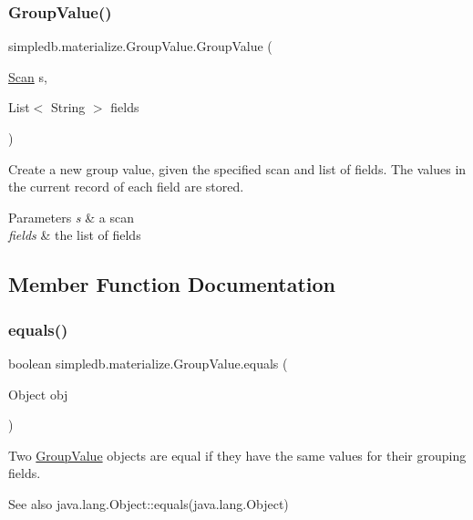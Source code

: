 \subsubsection{\texorpdfstring{Group\+Value()}{GroupValue()}}
{\footnotesize\ttfamily simpledb.\+materialize.\+Group\+Value.\+Group\+Value (\begin{DoxyParamCaption}\item[{\hyperlink{interfacesimpledb_1_1query_1_1Scan}{Scan}}]{s,  }\item[{List$<$ String $>$}]{fields }\end{DoxyParamCaption})\hspace{0.3cm}{\ttfamily [inline]}}

Create a new group value, given the specified scan and list of fields. The values in the current record of each field are stored. 
\begin{DoxyParams}{Parameters}
{\em s} & a scan \\
\hline
{\em fields} & the list of fields \\
\hline
\end{DoxyParams}


\subsection{Member Function Documentation}
\mbox{\label{classsimpledb_1_1materialize_1_1GroupValue_a5b0b30fc31eb67a79015bdc8b08340b0}} 
\subsubsection{\texorpdfstring{equals()}{equals()}}
{\footnotesize\ttfamily boolean simpledb.\+materialize.\+Group\+Value.\+equals (\begin{DoxyParamCaption}\item[{Object}]{obj }\end{DoxyParamCaption})\hspace{0.3cm}{\ttfamily [inline]}}

Two \hyperlink{classsimpledb_1_1materialize_1_1GroupValue}{Group\+Value} objects are equal if they have the same values for their grouping fields. \begin{DoxySeeAlso}{See also}
java.\+lang.\+Object\+::equals(java.\+lang.\+Object) 
\end{DoxySeeAlso}
\mbox{\label{classsimpledb_1_1materialize_1_1GroupValue_af53c8c966b982c0b62f6db2ec07fcbd0}} 

